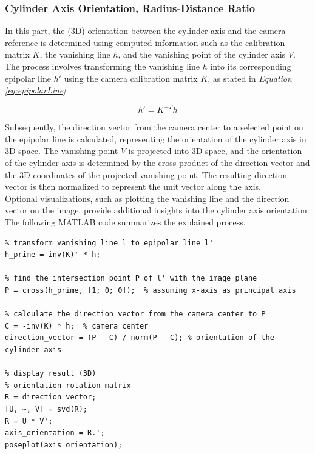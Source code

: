 \documentclass[12pt,a4paper]{article}
\begin{document}
\subsubsection{Cylinder Axis Orientation, Radius-Distance Ratio}\label{sec:toRadiusDistanceRatio}
In this part, the (3D) orientation between the cylinder axis and the camera reference is determined using computed information such as the calibration matrix $K$, the vanishing line $h$, and the vanishing point of the cylinder axis $V$.\\

The process involves transforming the vanishing line $h$ into its corresponding epipolar line $h'$ using the camera calibration matrix $K$, as stated in \textit{Equation \ref{eq:epipolarLine}}.

\begin{equation}
    h' = K^{-T}h
    \label{eq:epipolarLine}
\end{equation}
\bigskip

Subsequently, the direction vector from the camera center to a selected point on the epipolar line is calculated, representing the orientation of the cylinder axis in 3D space. The vanishing point $V$ is projected into 3D space, and the orientation of the cylinder axis is determined by the cross product of the direction vector and the 3D coordinates of the projected vanishing point. The resulting direction vector is then normalized to represent the unit vector along the axis.\\

Optional visualizations, such as plotting the vanishing line and the direction vector on the image, provide additional insights into the cylinder axis orientation.\\

The following MATLAB code summarizes the explained process.

\begin{verbatim}
% transform vanishing line l to epipolar line l'
h_prime = inv(K)' * h;

% find the intersection point P of l' with the image plane
P = cross(h_prime, [1; 0; 0]);  % assuming x-axis as principal axis

% calculate the direction vector from the camera center to P
C = -inv(K) * h;  % camera center
direction_vector = (P - C) / norm(P - C); % orientation of the cylinder axis

% display result (3D)
% orientation rotation matrix
R = direction_vector;
[U, ~, V] = svd(R);
R = U * V';
axis_orientation = R.';
poseplot(axis_orientation);
\end{verbatim}
\end{document}
